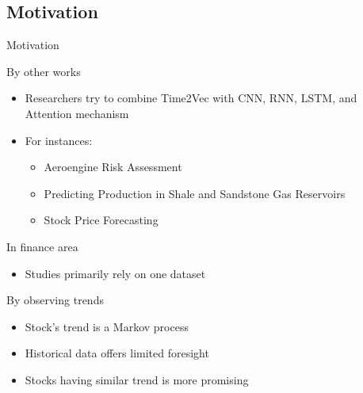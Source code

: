 \documentclass[compress, mathserif, fleqn, 10pt]{beamer}
\begin{document}
	\subsection{Motivation}
	\begin{frame}{Motivation}
		\begin{block}{By other works}
			\begin{itemize}
				\item Researchers try to combine Time2Vec with CNN, RNN, LSTM, and
				Attention mechanism
				
				\item For instances:
				
				\begin{itemize}
					\item Aeroengine Risk Assessment
					
					\item Predicting Production in Shale and Sandstone Gas Reservoirs
					
					\item Stock Price Forecasting
				\end{itemize}
			\end{itemize}
		\end{block}
		\smallskip
		\begin{block}{In finance area}
			\begin{itemize}
				\item Studies primarily rely on one dataset
			\end{itemize}
		\end{block}
		\smallskip
		\begin{block}{By observing trends}
			\begin{itemize}
				\item Stock's trend is a Markov process
				
				\item Historical data offers limited foresight
				
				\item Stocks having similar trend is more promising
			\end{itemize}
		\end{block}
	\end{frame}
	
\end{document}
